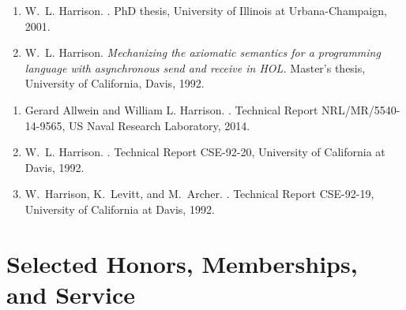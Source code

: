 \documentclass[11pt]{article}
\begin{document}

\begin{enumerate}[leftmargin=0.0mm]

\item
W.~L. Harrison.
.
\newblock PhD thesis, University of Illinois at Urbana-Champaign, 2001.

\item
W.~L. Harrison.
\newblock \emph{Mechanizing the axiomatic semantics for a programming language with
  asynchronous send and receive in {HOL}.}
\newblock Master's thesis, University of California, Davis, 1992.


\end{enumerate}




\begin{enumerate}[leftmargin=0.0mm]

\item
Gerard Allwein and William L. Harrison.
.
\newblock Technical Report NRL/MR/5540-14-9565, US Naval Research Laboratory, 2014. 

\item
W.~L. Harrison.
.
\newblock Technical Report CSE-92-20, University of California at Davis, 1992.


\item
W.~Harrison, K.~Levitt, and M.~Archer.
.
\newblock Technical Report CSE-92-19, University of California at Davis, 1992.

\end{enumerate}



\section{Selected Honors, Memberships, and Service}
\end{document}
